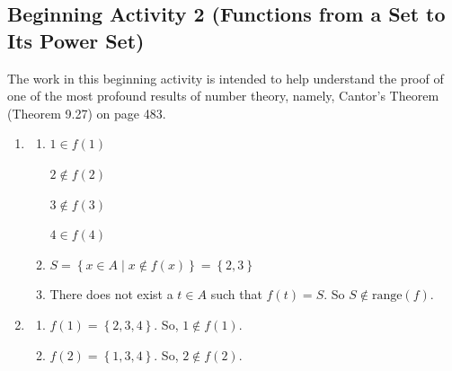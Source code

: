 \documentclass[11pt]{article}
\begin{document}
\hbreak
\newpage




\subsection*{Beginning Activity 2 (Functions from a Set to Its Power Set)}
The work in this beginning activity is intended to help understand the proof of one of the most profound results of number theory, namely, Cantor's Theorem (Theorem 9.27) on page 483.
\begin{enumerate}
%

\item \begin{enumerate}
\item \begin{multicols}{4}
$1 \in f \left( 1 \right)$

$2 \notin f \left( 2 \right)$

$3 \notin f \left( 3 \right)$

$4 \in f \left( 4 \right)$
\end{multicols}

\item $S = \left\{ x \in A \mid x \notin f \left( x \right) \right\} = \left\{ 2, 3 \right\}$

\item There does not exist a $t \in A$ such that $f \left( t \right) = S$.  So 
$S \notin \text{range} \left( f \right)$.
\end{enumerate}

\item \begin{enumerate}
\item $f \left( 1 \right) = \left\{ 2, 3, 4 \right\}$.  So, $1 \notin f \left( 1 \right)$.

\item $f \left( 2 \right) = \left\{ 1, 3, 4 \right\}$.  So, $2 \notin f \left( 2 \right)$.


\end{enumerate}
\end{enumerate}
\end{document}
